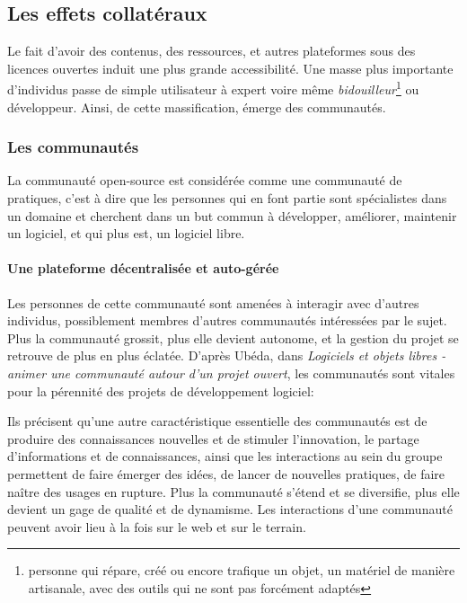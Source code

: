     \subsection{Les effets collatéraux}\label{sec:com-open}
            Le fait d'avoir des contenus, des ressources, et autres plateformes sous des licences ouvertes induit une plus grande accessibilité. Une masse plus importante d'individus passe de simple utilisateur à expert voire même \textit{bidouilleur}\footnote{personne qui répare, créé ou encore trafique un objet, un matériel de manière artisanale, avec des outils qui ne sont pas forcément adaptés} ou développeur. Ainsi, de cette massification, émerge des communautés.
        \subsubsection{Les communautés}
            La communauté open-source est considérée comme une communauté de pratiques, c'est à dire que les personnes qui en font partie sont spécialistes dans un domaine et cherchent dans un but commun à développer, améliorer, maintenir un logiciel, et qui plus est, un logiciel libre. 
            \paragraph{Une plateforme décentralisée et auto-gérée}    
                Les personnes de cette communauté sont amenées à interagir avec d'autres individus, possiblement membres d'autres communautés intéressées par le sujet. Plus la communauté grossit, plus elle devient autonome, et la gestion du projet se retrouve de plus en plus éclatée.
                D’après Ubéda, dans \textit{Logiciels et objets libres - animer une communauté autour d'un projet ouvert}, les communautés sont vitales pour la pérennité des projets de développement logiciel:  
                \par%
                Ils précisent qu’une autre caractéristique essentielle des communautés est de produire des connaissances nouvelles et de stimuler l’innovation, le partage d’informations  et  de  connaissances,  ainsi  que  les  interactions au  sein du groupe permettent de faire émerger des idées, de lancer de nouvelles pratiques, de faire naître des usages en rupture. 
                Plus la communauté s’étend et se diversifie, plus elle devient un gage de qualité et de dynamisme. 
                Les interactions d'une communauté peuvent avoir lieu à la fois sur le web et sur le terrain. 
